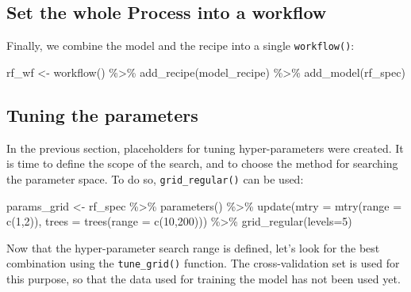 \documentclass[
]{krantz}
\makeatletter
\newenvironment{Shaded}{\begin{snugshade}}{\end{snugshade}}
\newcommand{\AttributeTok}[1]{\textcolor[rgb]{0.61,0.61,0.61}{#1}}
\newcommand{\DecValTok}[1]{\textcolor[rgb]{0.06,0.06,0.06}{#1}}
\newcommand{\FunctionTok}[1]{\textcolor[rgb]{0,0,0}{#1}}
\newcommand{\NormalTok}[1]{#1}
\newcommand{\OtherTok}[1]{\textcolor[rgb]{0.37,0.37,0.37}{#1}}
\newcommand{\SpecialCharTok}[1]{\textcolor[rgb]{0,0,0}{#1}}
\newenvironment{kframe}{%
\medskip{}
\setlength{\fboxsep}{.8em}
 \def\at@end@of@kframe{}%
 \ifinner\ifhmode%
  \def\at@end@of@kframe{\end{minipage}}%
  \begin{minipage}{\columnwidth}%
 \fi\fi%
 \def\FrameCommand##1{\hskip\@totalleftmargin \hskip-\fboxsep
 \colorbox{shadecolor}{##1}\hskip-\fboxsep
     \hskip-\linewidth \hskip-\@totalleftmargin \hskip\columnwidth}%
 \MakeFramed {\advance\hsize-\width
   \@totalleftmargin\z@ \linewidth\hsize
   \@setminipage}}%
 {\par\unskip\endMakeFramed%
 \at@end@of@kframe}
\renewenvironment{Shaded}{\begin{kframe}}{\end{kframe}}
\makeatother
\begin{document}
\hypertarget{set-the-whole-process-into-a-workflow}{%
\subsection{Set the whole Process into a workflow}\label{set-the-whole-process-into-a-workflow}}

Finally, we combine the model and the recipe into a single \texttt{workflow()}:

\begin{Shaded}
\begin{Highlighting}[]
\NormalTok{rf\_wf }\OtherTok{\textless{}{-}} \FunctionTok{workflow}\NormalTok{() }\SpecialCharTok{\%\textgreater{}\%}
  \FunctionTok{add\_recipe}\NormalTok{(model\_recipe) }\SpecialCharTok{\%\textgreater{}\%} 
  \FunctionTok{add\_model}\NormalTok{(rf\_spec)}
\end{Highlighting}
\end{Shaded}

\hypertarget{tuning-the-parameters}{%
\subsection{Tuning the parameters}\label{tuning-the-parameters}}

In the previous section, placeholders for tuning hyper-parameters were created. It is time to define the scope of the search, and to choose the method for searching the parameter space. To do so, \texttt{grid\_regular()} can be used:

\begin{Shaded}
\begin{Highlighting}[]
\NormalTok{params\_grid }\OtherTok{\textless{}{-}}\NormalTok{ rf\_spec }\SpecialCharTok{\%\textgreater{}\%}
  \FunctionTok{parameters}\NormalTok{() }\SpecialCharTok{\%\textgreater{}\%}
  \FunctionTok{update}\NormalTok{(}\AttributeTok{mtry =} \FunctionTok{mtry}\NormalTok{(}\AttributeTok{range =} \FunctionTok{c}\NormalTok{(}\DecValTok{1}\NormalTok{,}\DecValTok{2}\NormalTok{)),}
         \AttributeTok{trees =} \FunctionTok{trees}\NormalTok{(}\AttributeTok{range =} \FunctionTok{c}\NormalTok{(}\DecValTok{10}\NormalTok{,}\DecValTok{200}\NormalTok{))) }\SpecialCharTok{\%\textgreater{}\%} 
  \FunctionTok{grid\_regular}\NormalTok{(}\AttributeTok{levels=}\DecValTok{5}\NormalTok{)}
\end{Highlighting}
\end{Shaded}

Now that the hyper-parameter search range is defined, let's look for the best combination using the \texttt{tune\_grid()} function. The cross-validation set is used for this purpose, so that the data used for training the model has not been used yet.
\end{document}
